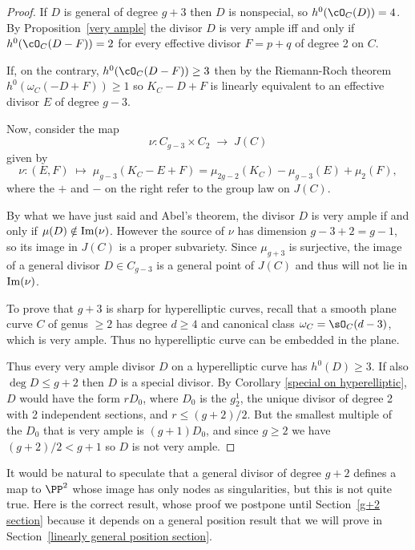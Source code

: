 \begin{proof}
If $D$ is general of degree $g+3$ then $D$ is nonspecial, so $h^0(\cO_C(D)) = 4$. By Proposition~\ref{very ample} the divisor
$D$ is very ample iff and only if $h^0(\cO_C(D-F)) = 2$
for every effective divisor $F = p+q$ of degree 2 on $C$.

If, on the contrary, $h^0(\cO_C(D-F)) \geq 3$ then by the Riemann-Roch theorem $h^0(\omega_C(-D + F)) \geq 1$
so $K_C - D + F$ is  linearly equivalent to 
an effective divisor $E$ of degree $g-3$.

Now, consider the map 
$$
\nu : C_{g-3} \times C_{2} \; \to \; J(C)
$$
given by
$$
\nu : (E,F) \; \mapsto \; \mu_{g-3}(K_C - E + F) = \mu_{2g-2}(K_C) - \mu_{g-3}(E) + \mu_{2}(F), 
$$
where the $+$ and $-$ on the right refer to the group law on $J(C)$. 

By what we have just said and Abel's theorem, the divisor $D$ is very ample if and only if
$\mu(D) \notin {\rm Im}(\nu)$. However the source of $\nu$ has dimension $g-3+2 = g-1$, so its image in $J(C)$ is a proper subvariety. Since $\mu_{g+3}$ is surjective, the image of a general divisor $D \in C_{g-3}$ is a general point of $J(C)$ and thus will not lie in ${\rm Im}(\nu)$. 

To prove that $g+3$ is sharp for hyperelliptic curves, recall that a smooth plane curve $C$ of genus $\geq 2$
has degree $d\geq 4$ and canonical class $\omega_{C} = \sO_{C}(d-3)$, which is very ample. Thus
no hyperelliptic curve  can
be embedded in the plane.

Thus every very ample divisor $D$ on a hyperelliptic curve  has $h^0(D) \geq 3$. If also $\deg D \leq g+2$
then $D$ is a special divisor. By Corollary \ref{special on hyperelliptic}, $D$ would have the form
$rD_0$, where $D_0$ is the $g^1_2$, the unique divisor of degree 2 with 2 independent sections,
and $r \leq (g+2)/2$. But the smallest multiple of the $D_0$ that is very ample is $(g+1)D_0$, and
since $g\geq 2$ we have $(g+2)/2 < g+1$ so $D$ is not very ample.
\end{proof}

It would be natural to speculate that a general divisor of degree $g+2$ defines a map to $\PP^2$ whose
image has only nodes as singularities, but this is not quite true. Here is the correct result,
whose proof we postpone until Section~\ref{g+2 section} because it depends on a general position result that 
we will prove in Section~\ref{linearly general position section}.

